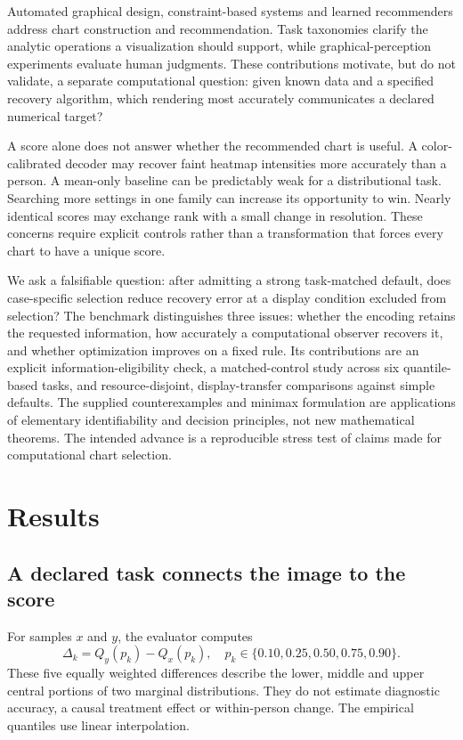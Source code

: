 \documentclass[11pt]{article}
\begin{document}
Automated graphical design, constraint-based systems and learned recommenders address chart construction and recommendation.\cite{mackinlay1986,draco,vizml} Task taxonomies clarify the analytic operations a visualization should support, while graphical-perception experiments evaluate human judgments.\cite{amar2005,cleveland1984} These contributions motivate, but do not validate, a separate computational question: given known data and a specified recovery algorithm, which rendering most accurately communicates a declared numerical target?

A score alone does not answer whether the recommended chart is useful. A color-calibrated decoder may recover faint heatmap intensities more accurately than a person. A mean-only baseline can be predictably weak for a distributional task. Searching more settings in one family can increase its opportunity to win. Nearly identical scores may exchange rank with a small change in resolution. These concerns require explicit controls rather than a transformation that forces every chart to have a unique score.

We ask a falsifiable question: after admitting a strong task-matched default, does case-specific selection reduce recovery error at a display condition excluded from selection? The benchmark distinguishes three issues: whether the encoding retains the requested information, how accurately a computational observer recovers it, and whether optimization improves on a fixed rule. Its contributions are an explicit information-eligibility check, a matched-control study across six quantile-based tasks, and resource-disjoint, display-transfer comparisons against simple defaults. The supplied counterexamples and minimax formulation are applications of elementary identifiability and decision principles, not new mathematical theorems. The intended advance is a reproducible stress test of claims made for computational chart selection.

\section*{Results}
\subsection*{A declared task connects the image to the score}
For samples $x$ and $y$, the evaluator computes
\begin{equation}
\Delta_k=Q_y(p_k)-Q_x(p_k),\quad p_k\in\{0.10,0.25,0.50,0.75,0.90\}.
\label{eq:target}
\end{equation}
These five equally weighted differences describe the lower, middle and upper central portions of two marginal distributions. They do not estimate diagnostic accuracy, a causal treatment effect or within-person change. The empirical quantiles use linear interpolation.
\end{document}
